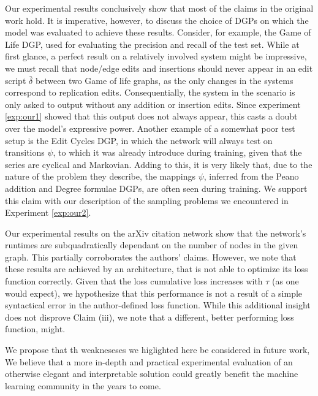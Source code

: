 Our experimental results conclusively show that most of the claims in the original work hold. It is imperative, however, to discuss the choice of DGPs on which the model was evaluated to achieve these results.
Consider, for example, the Game of Life DGP, used for evaluating the precision and recall of the test set. While at first glance, a perfect result on a relatively involved system might be impressive, we must recall that node/edge edits and insertions should never appear in an edit script $\bar{\delta}$ between two Game of life graphs, as the only changes in the systems correspond to replication edits. Consequentially, the system in the scenario is only asked to output without any addition or insertion edits. Since experiment \ref{exp:our1} showed that this output does not always appear, this casts a doubt over the model's expressive power. Another example of a somewhat poor test setup is the Edit Cycles DGP, in which the network will always test on transitions $\psi$, to which it was already introduce during training, given that the series are cyclical and Markovian. Adding to this, it is very likely that, due to the nature of the problem they describe, the mappings $\psi$, inferred from the Peano addition and Degree formulae DGPs, are often seen during training. We support this claim with our description of the sampling problems we encountered in Experiment \ref{exp:our2}.

Our experimental results on the arXiv citation network show that the network's runtimes are subquadratically dependant on the number of nodes in the given graph. This partially corroborates the authors' claims. However, we note that these results are achieved by an architecture, that is not able to optimize its loss function correctly. Given that the loss cumulative loss increases with $\tau$ (as one would expect), we hypothesize that this performance is not a result of a simple syntactical error in the author-defined loss function. While this additional insight does not disprove Claim (iii), 
we note that a different, better performing loss function, might.

We propose that th weakneseses we higlighted here be considered in future work, We believe that a more in-depth and practical experimental evaluation of an otherwise elegant and interpretable solution could greatly benefit the machine learning community in the years to come.


